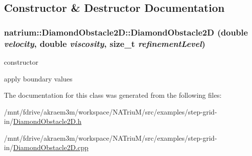 \subsection{Constructor \& Destructor Documentation}
\hypertarget{classnatrium_1_1DiamondObstacle2D_a466c22e26de373b06ccba9c5e0a23c33}{
\subsubsection[{DiamondObstacle2D}]{\setlength{\rightskip}{0pt plus 5cm}natrium::DiamondObstacle2D::DiamondObstacle2D (double {\em velocity}, \/  double {\em viscosity}, \/  size\_\-t {\em refinementLevel})}}
\label{classnatrium_1_1DiamondObstacle2D_a466c22e26de373b06ccba9c5e0a23c33}


constructor 

apply boundary values 

The documentation for this class was generated from the following files:\begin{DoxyCompactItemize}
\item 
/mnt/fdrive/akraem3m/workspace/NATriuM/src/examples/step-\/grid-\/in/\hyperlink{DiamondObstacle2D_8h}{DiamondObstacle2D.h}\item 
/mnt/fdrive/akraem3m/workspace/NATriuM/src/examples/step-\/grid-\/in/\hyperlink{DiamondObstacle2D_8cpp}{DiamondObstacle2D.cpp}\end{DoxyCompactItemize}
